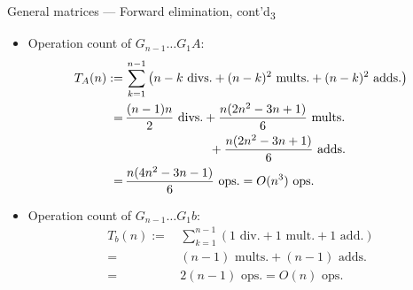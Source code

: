 \documentclass[t,usepdftitle=false]{beamer}
\begin{document}
\begin{frame}{General matrices --- Forward elimination, cont'd\textsubscript{3}}
\begin{itemize}
\item Operation count of $G_{n-1}\dots G_1A$:
\begin{align*}
T_A(n):=&\,\sum_{k=1}^{n-1}\left(n-k\text{ divs.}+(n-k)^2\text{ mults.}+(n-k)^2\text{ adds.}\right)\\
=&\,\frac{(n-1)n}{2}\text{ divs.}
+\frac{n(2n^2-3n+1)}{6}\text{ mults.}\\
&\hspace{2.44cm}+\frac{n(2n^2-3n+1)}{6}\text{ adds.}\\
=&\,\frac{n(4n^2-3n-1)}{6}\text{ ops.}=O(n^3)\text{ ops.}
\end{align*}
\item Operation count of $G_{n-1}\dots G_1b$:
\begin{align*}
T_b(n):=&\,\sum_{k=1}^{n-1}\left(1\text{ div.}+1\text{ mult.}+1\text{ add.}\right)\\
=&\,(n-1)\text{ mults.}+(n-1)\text{ adds.}\\
=&\,2(n-1)\text{ ops.}=O(n)\text{ ops.}
\end{align*}
\end{itemize}
\end{frame}
\end{document}
